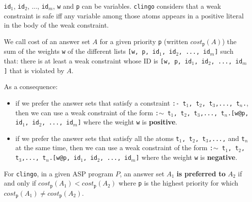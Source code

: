 \smallskip

\begin{remark}

\texttt{id$_1$}, \texttt{id$_2$}, ..., \texttt{id$_m$}, \texttt{w} and \texttt{p} can be variables. \texttt{clingo} considers that a weak constraint is safe iff any variable among those atoms appears in a positive literal in the body of the weak constraint. 

\end{remark}

\smallskip

We call cost of an answer set $A$ for a given priority \texttt{p} (written $cost_{\texttt{p}}(A)$) the sum of the weights \texttt{w} of the different lists \texttt{[\texttt{w}, \texttt{p}, id$_1$, id$_2$, ..., id$_m$]} such that: there is at least a weak constraint whose ID is  \texttt{[\texttt{w}, \texttt{p}, id$_1$, id$_2$, ..., id$_m$]} that is violated by $A$.

\bigskip

As a consequence:
\begin{itemize}
\item if we prefer the answer sets that satisfy a constraint \texttt{:- t$_1$, t$_2$, t$_3$,..., t$_n$.}, then we can use a weak constraint of the form \texttt{:$\sim$ t$_1$, t$_2$, t$_3$,..., t$_n$.[w@p, id$_1$, id$_2$, ..., id$_m$]} where the weight \texttt{w} is \textbf{positive}.
\item if we prefer the answer sets that satisfy all the atoms \texttt{t$_1$, t$_2$, t$_3$,...,} and \texttt{t$_n$} at the same time, then we can use a weak constraint of the form \texttt{:$\sim$ t$_1$, t$_2$, t$_3$,..., t$_n$.[w@p, id$_1$, id$_2$, ..., id$_m$]} where the weight \texttt{w} is \textbf{negative}.
\end{itemize}

\smallskip

For \texttt{clingo}, in a given ASP program $P$, an answer set $A_1$ \textbf{is preferred to} $A_2$ if and only if $cost_{\texttt{p}}(A_1)<cost_{\texttt{p}}(A_2)$ where \texttt{p} is the highest priority for which $cost_{\texttt{p}}(A_1)\neq cost_{\texttt{p}}(A_2)$.

